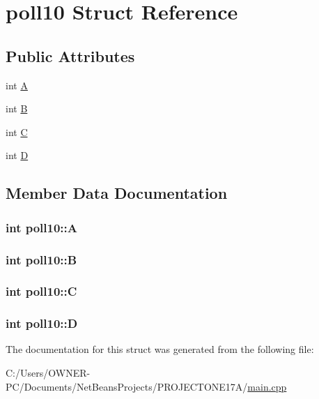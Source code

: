 \hypertarget{structpoll10}{\section{poll10 Struct Reference}
\label{structpoll10}
}
\subsection*{Public Attributes}
\begin{DoxyCompactItemize}
\item 
int \hyperlink{structpoll10_a3671006eff247d529dbe720be434a978}{A}
\item 
int \hyperlink{structpoll10_a7b8105197851b8a41fdbb08804cd989d}{B}
\item 
int \hyperlink{structpoll10_a8420aba97c16fd3560db6cfa1baec8f5}{C}
\item 
int \hyperlink{structpoll10_a2ab84b6cf7e6d68cf8d2410d45a5ceed}{D}
\end{DoxyCompactItemize}


\subsection{Member Data Documentation}
\hypertarget{structpoll10_a3671006eff247d529dbe720be434a978}{
\subsubsection[{A}]{\setlength{\rightskip}{0pt plus 5cm}int poll10\+::\+A}}\label{structpoll10_a3671006eff247d529dbe720be434a978}
\hypertarget{structpoll10_a7b8105197851b8a41fdbb08804cd989d}{
\subsubsection[{B}]{\setlength{\rightskip}{0pt plus 5cm}int poll10\+::\+B}}\label{structpoll10_a7b8105197851b8a41fdbb08804cd989d}
\hypertarget{structpoll10_a8420aba97c16fd3560db6cfa1baec8f5}{
\subsubsection[{C}]{\setlength{\rightskip}{0pt plus 5cm}int poll10\+::\+C}}\label{structpoll10_a8420aba97c16fd3560db6cfa1baec8f5}
\hypertarget{structpoll10_a2ab84b6cf7e6d68cf8d2410d45a5ceed}{
\subsubsection[{D}]{\setlength{\rightskip}{0pt plus 5cm}int poll10\+::\+D}}\label{structpoll10_a2ab84b6cf7e6d68cf8d2410d45a5ceed}


The documentation for this struct was generated from the following file\+:\begin{DoxyCompactItemize}
\item 
C\+:/\+Users/\+O\+W\+N\+E\+R-\/\+P\+C/\+Documents/\+Net\+Beans\+Projects/\+P\+R\+O\+J\+E\+C\+T\+O\+N\+E17\+A/\hyperlink{main_8cpp}{main.\+cpp}\end{DoxyCompactItemize}
